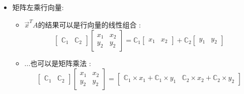 \documentclass[UTF8,12pt]{ctexbook}
\newcommand{\mathConstant}{\mathbb{C}}
\newcommand{\transpose}{^T}
\begin{document}
{{{{{\begin{itemize}
{\begin{itemize}
{$$\begin{bmatrix}
                        a_{21} \times x_{11} + a_{22} \times x_{21}
                      \end{bmatrix}
                    $$
                    }
            \end{itemize}
            }
      \item {
            矩阵左乘行向量:
            \begin{itemize}
              \item {
                    $\vec{x}\transpose A$的结果可以是行向量的线性组合 :
                    $$
                      \begin{bmatrix}
                        \mathConstant_1 & \mathConstant_2
                      \end{bmatrix}
                      \begin{bmatrix}
                        x_1 & x_2 \\
                        y_2 & y_2
                      \end{bmatrix}
                      =
                      \mathConstant_1\begin{bmatrix}
                        x_1 & x_2
                      \end{bmatrix}
                      +
                      \mathConstant_2\begin{bmatrix}
                        y_1 & y_2
                      \end{bmatrix}
                    $$
                    }
              \item {
                    ...也可以是矩阵乘法 :
                    $$
                      \begin{bmatrix}
                        \mathConstant_1 & \mathConstant_2
                      \end{bmatrix}
                      \begin{bmatrix}
                        x_1 & x_2 \\
                        y_2 & y_2
                      \end{bmatrix}
                      =
                      \begin{bmatrix}
                        \mathConstant_1 \times x_1 + \mathConstant_1 \times y_1 & \mathConstant_2 \times x_2 + \mathConstant_2 \times y_2
                      \end{bmatrix}
                    $$
                    }
            \end{itemize}
            }
    \end{itemize}
  }%

}}}}
\end{document}
